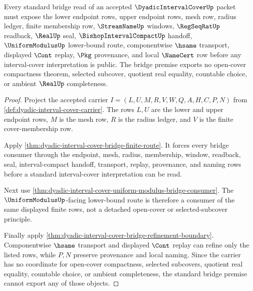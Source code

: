\begin{theorem}
\label{thm:dyadicintervalcover-standard-bridge-premise}
Every standard bridge read of an accepted $\DyadicIntervalCoverUp$ packet must expose the lower endpoint rows, upper endpoint rows, mesh row, radius ledger, finite membership row, $\StreamNameUp$ windows, $\RegSeqRatUp$ readback, $\RealUp$ seal, $\BishopIntervalCompactUp$ handoff, $\UniformModulusUp$ lower-bound route, componentwise $\hsame$ transport, displayed $\Cont$ replay, $\Pkg$ provenance, and local $\NameCert$ row before any interval-cover interpretation is public. The bridge premise exports no open-cover compactness theorem, selected subcover, quotient real equality, countable choice, or ambient $\RealUp$ completeness.
\end{theorem}
\begin{proof}
Project the accepted carrier $I=(L,U,M,R,V,W,Q,A,H,C,P,N)$ from \autoref{def:dyadic-interval-cover-carrier}. The rows $L,U$ are the lower and upper endpoint rows, $M$ is the mesh row, $R$ is the radius ledger, and $V$ is the finite cover-membership row.

Apply \autoref{thm:dyadic-interval-cover-bridge-finite-route}. It forces every bridge consumer through the endpoint, mesh, radius, membership, window, readback, seal, interval-compact handoff, transport, replay, provenance, and naming rows before a standard interval-cover interpretation can be read.

Next use \autoref{thm:dyadic-interval-cover-uniform-modulus-bridge-consumer}. The $\UniformModulusUp$-facing lower-bound route is therefore a consumer of the same displayed finite rows, not a detached open-cover or selected-subcover principle.

Finally apply \autoref{thm:dyadic-interval-cover-bridge-refinement-boundary}. Componentwise $\hsame$ transport and displayed $\Cont$ replay can refine only the listed rows, while $P,N$ preserve provenance and local naming. Since the carrier has no coordinate for open-cover compactness, selected subcovers, quotient real equality, countable choice, or ambient completeness, the standard bridge premise cannot export any of those objects.
\end{proof}
